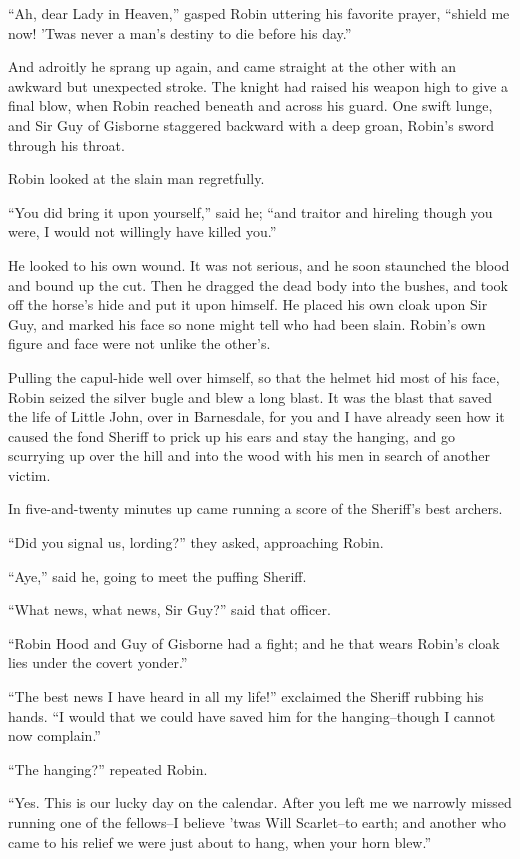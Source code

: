 ``Ah, dear Lady in Heaven,'' gasped Robin uttering his favorite prayer,
``shield me now! 'Twas never a man's destiny to die before his day.''

And adroitly he sprang up again, and came straight at the other with an
awkward but unexpected stroke. The knight had raised his weapon high to
give a final blow, when Robin reached beneath and across his guard. One
swift lunge, and Sir Guy of Gisborne staggered backward with a deep
groan, Robin's sword through his throat.

Robin looked at the slain man regretfully.

``You did bring it upon yourself,'' said he; ``and traitor and hireling
though you were, I would not willingly have killed you.''

He looked to his own wound. It was not serious, and he soon staunched
the blood and bound up the cut. Then he dragged the dead body into the
bushes, and took off the horse's hide and put it upon himself. He placed
his own cloak upon Sir Guy, and marked his face so none might tell who
had been slain. Robin's own figure and face were not unlike the other's.

Pulling the capul-hide well over himself, so that the helmet hid most of
his face, Robin seized the silver bugle and blew a long blast. It was
the blast that saved the life of Little John, over in Barnesdale, for
you and I have already seen how it caused the fond Sheriff to prick up
his ears and stay the hanging, and go scurrying up over the hill and
into the wood with his men in search of another victim.

In five-and-twenty minutes up came running a score of the Sheriff's best
archers.

``Did you signal us, lording?'' they asked, approaching Robin.

``Aye,'' said he, going to meet the puffing Sheriff.

``What news, what news, Sir Guy?'' said that officer.

``Robin Hood and Guy of Gisborne had a fight; and he that wears Robin's
cloak lies under the covert yonder.''

``The best news I have heard in all my life!'' exclaimed the Sheriff
rubbing his hands. ``I would that we could have saved him for the
hanging--though I cannot now complain.''

``The hanging?'' repeated Robin.

``Yes. This is our lucky day on the calendar. After you left me we
narrowly missed running one of the fellows--I believe 'twas Will
Scarlet--to earth; and another who came to his relief we were just about
to hang, when your horn blew.''

